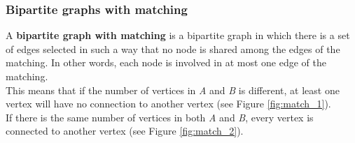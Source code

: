 \begin{figure}[H]
    \centering
    \caption{}
    \label{fig:bipartite}
\end{figure}



\subsubsection{Bipartite graphs with matching}
A \textbf{bipartite graph with matching} is a bipartite graph in which there is a set of edges selected in such a way that no node is shared among the edges of the matching.
In other words, each node is involved in at most one edge of the matching. \\
This means that if the number of vertices in \textit{A} and \textit{B} is different, at least one vertex will have no connection to another vertex (see Figure \ref{fig:match_1}). \\
If there is the same number of vertices in both \textit{A} and \textit{B}, every vertex is connected to another vertex (see Figure \ref{fig:match_2}). \\
 
